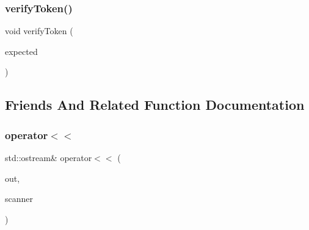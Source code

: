 \subsubsection{\texorpdfstring{verify\+Token()}{verifyToken()}}
{\footnotesize\ttfamily void verify\+Token (\begin{DoxyParamCaption}\item[{const std\+::string \&}]{expected }\end{DoxyParamCaption})}



\subsection{Friends And Related Function Documentation}
\mbox{\label{classTokenScanner_a23b7e3f2cb864430084bde0951947124}} 
\subsubsection{\texorpdfstring{operator$<$$<$}{operator<<}}
{\footnotesize\ttfamily std\+::ostream\& operator$<$$<$ (\begin{DoxyParamCaption}\item[{std\+::ostream \&}]{out,  }\item[{const \mbox{\hyperlink{classTokenScanner}{Token\+Scanner}} \&}]{scanner }\end{DoxyParamCaption})\hspace{0.3cm}{\ttfamily [friend]}}

